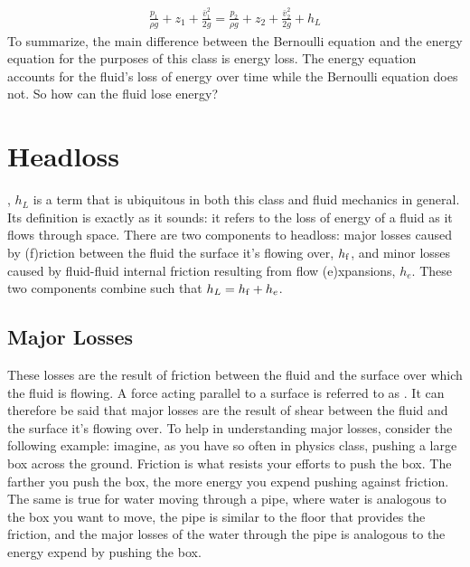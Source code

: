 \documentclass[letterpaper,10pt,english]{sphinxmanual}
\begin{document}
\begin{equation}\label{equation:Fluids_Review/Fluids_Review_Design:Fluids_Review/Fluids_Review_Design:8}
\begin{split}\frac{p_{1}}{\rho g} + z_{1} + \frac{\bar v_{1}^2}{2g} = \frac{p_{2}}{\rho g} + z_{2} + \frac{\bar v_{2}^2}{2g} + h_L\end{split}
\end{equation}
 To summarize, the main difference between the Bernoulli equation and the energy equation for the purposes of this class is energy loss. The energy equation accounts for the fluid’s loss of energy over time while the Bernoulli equation does not. So how can the fluid lose energy?


\section{Headloss}
\label{\detokenize{Fluids_Review/Fluids_Review_Design:headloss}}\label{\detokenize{Fluids_Review/Fluids_Review_Design:id6}}
, \(h_L\) is a term that is ubiquitous in both this class and fluid mechanics in general. Its definition is exactly as it sounds: it refers to the loss of energy of a fluid as it flows through space. There are two components to headloss: major losses caused by (f)riction between the fluid the surface it’s flowing over, \(h_{\rm{f}}\), and minor losses caused by fluid-fluid internal friction resulting from flow (e)xpansions, \(h_e\). These two components combine such that \(h_L = h_{\rm{f}} + h_e\).


\subsection{Major Losses}
\label{\detokenize{Fluids_Review/Fluids_Review_Design:major-losses}}\label{\detokenize{Fluids_Review/Fluids_Review_Design:id7}}
These losses are the result of friction between the fluid and the surface over which the fluid is flowing. A force acting parallel to a surface is referred to as . It can therefore be said that major losses are the result of shear between the fluid and the surface it’s flowing over. To help in understanding major losses, consider the following example: imagine, as you have so often in physics class, pushing a large box across the ground. Friction is what resists your efforts to push the box. The farther you push the box, the more energy you expend pushing against friction. The same is true for water moving through a pipe, where water is analogous to the box you want to move, the pipe is similar to the floor that provides the friction, and the major losses of the water through the pipe is analogous to the energy  expend by pushing the box.
\end{document}
